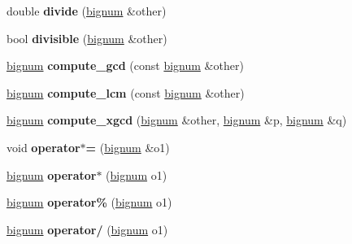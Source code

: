 \begin{DoxyCompactItemize}
\item 
\hypertarget{classbignum_a2c82d12c4e20bec0bf6ebd2ab5cd7da5}{double {\bfseries divide} (\hyperlink{classbignum}{bignum} \&other)}\label{classbignum_a2c82d12c4e20bec0bf6ebd2ab5cd7da5}

\item 
\hypertarget{classbignum_afdc96d92e3c87e394ade16d690809480}{bool {\bfseries divisible} (\hyperlink{classbignum}{bignum} \&other)}\label{classbignum_afdc96d92e3c87e394ade16d690809480}

\item 
\hypertarget{classbignum_aec60038c4d7ecd8891c40ca95126bc10}{\hyperlink{classbignum}{bignum} {\bfseries compute\-\_\-gcd} (const \hyperlink{classbignum}{bignum} \&other)}\label{classbignum_aec60038c4d7ecd8891c40ca95126bc10}

\item 
\hypertarget{classbignum_a8b732de6597c2062106cc31ec2abc4b5}{\hyperlink{classbignum}{bignum} {\bfseries compute\-\_\-lcm} (const \hyperlink{classbignum}{bignum} \&other)}\label{classbignum_a8b732de6597c2062106cc31ec2abc4b5}

\item 
\hypertarget{classbignum_afb3e0381f468dd324c77c294b1c52770}{\hyperlink{classbignum}{bignum} {\bfseries compute\-\_\-xgcd} (\hyperlink{classbignum}{bignum} \&other, \hyperlink{classbignum}{bignum} \&p, \hyperlink{classbignum}{bignum} \&q)}\label{classbignum_afb3e0381f468dd324c77c294b1c52770}

\item 
\hypertarget{classbignum_a2612bfd43d03554e88cdff205ea7025e}{void {\bfseries operator$\ast$=} (\hyperlink{classbignum}{bignum} \&o1)}\label{classbignum_a2612bfd43d03554e88cdff205ea7025e}

\item 
\hypertarget{classbignum_ab6356b0694d639510e2df5657c65d165}{\hyperlink{classbignum}{bignum} {\bfseries operator$\ast$} (\hyperlink{classbignum}{bignum} o1)}\label{classbignum_ab6356b0694d639510e2df5657c65d165}

\item 
\hypertarget{classbignum_ad5a8b3543b8b82f2d10a69cd1ceda40d}{\hyperlink{classbignum}{bignum} {\bfseries operator\%} (\hyperlink{classbignum}{bignum} o1)}\label{classbignum_ad5a8b3543b8b82f2d10a69cd1ceda40d}

\item 
\hypertarget{classbignum_a85d383868c3102f175f4aba2b685963a}{\hyperlink{classbignum}{bignum} {\bfseries operator/} (\hyperlink{classbignum}{bignum} o1)}\label{classbignum_a85d383868c3102f175f4aba2b685963a}


\end{DoxyCompactItemize}
